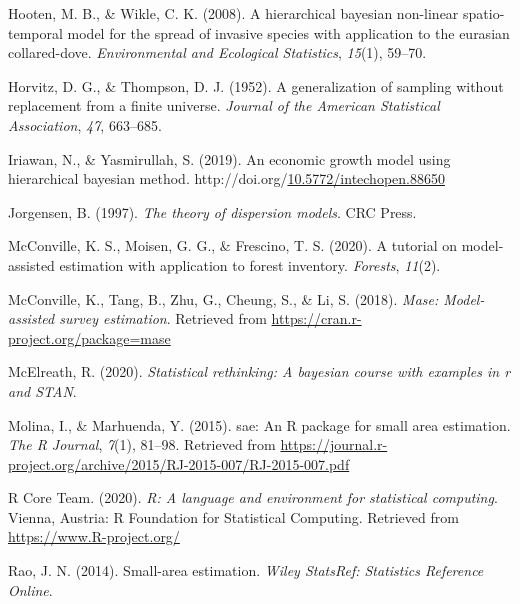 \documentclass[12pt,twoside]{reedthesis}
\newlength{\cslhangindent}
\newenvironment{CSLReferences}[2] %
 {%
  \setlength{\parindent}{0pt}
  \ifodd #1 \everypar{\setlength{\hangindent}{\cslhangindent}}\ignorespaces\fi
  \ifnum #2 > 0
  \setlength{\parskip}{#2\baselineskip}
  \fi
 }%
 {}
\begin{document}
\begin{CSLReferences}{1}{0}
\leavevmode{}%
Hooten, M. B., \& Wikle, C. K. (2008). A hierarchical bayesian non-linear spatio-temporal model for the spread of invasive species with application to the eurasian collared-dove. \emph{Environmental and Ecological Statistics}, \emph{15}(1), 59--70.

\leavevmode{}%
Horvitz, D. G., \& Thompson, D. J. (1952). A generalization of sampling without replacement from a finite universe. \emph{Journal of the American Statistical Association}, \emph{47}, 663--685.

\leavevmode{}%
Iriawan, N., \& Yasmirullah, S. (2019). An economic growth model using hierarchical bayesian method. http://doi.org/\href{https://doi.org/10.5772/intechopen.88650}{10.5772/intechopen.88650}

\leavevmode{}%
Jorgensen, B. (1997). \emph{The theory of dispersion models}. CRC Press.

\leavevmode{}%
McConville, K. S., Moisen, G. G., \& Frescino, T. S. (2020). A tutorial on model-assisted estimation with application to forest inventory. \emph{Forests}, \emph{11}(2).

\leavevmode{}%
McConville, K., Tang, B., Zhu, G., Cheung, S., \& Li, S. (2018). \emph{Mase: Model-assisted survey estimation}. Retrieved from \url{https://cran.r-project.org/package=mase}

\leavevmode{}%
McElreath, R. (2020). \emph{Statistical rethinking: A bayesian course with examples in r and STAN}.

\leavevmode{}%
Molina, I., \& Marhuenda, Y. (2015). {sae}: An {R} package for small area estimation. \emph{The R Journal}, \emph{7}(1), 81--98. Retrieved from \url{https://journal.r-project.org/archive/2015/RJ-2015-007/RJ-2015-007.pdf}

\leavevmode{}%
R Core Team. (2020). \emph{R: A language and environment for statistical computing}. Vienna, Austria: R Foundation for Statistical Computing. Retrieved from \url{https://www.R-project.org/}

\leavevmode{}%
Rao, J. N. (2014). Small-area estimation. \emph{Wiley StatsRef: Statistics Reference Online}.


\end{CSLReferences}
\end{document}
